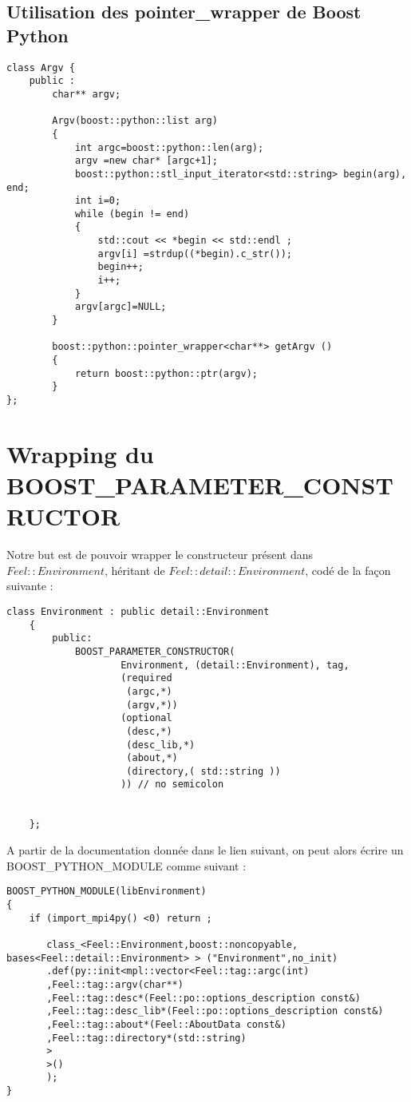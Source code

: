 \documentclass[12pt]{article}
\begin{document}
\subsection{Utilisation des pointer\_wrapper de Boost Python}

\begin{lstlisting}
class Argv {
    public :
        char** argv;

        Argv(boost::python::list arg)
        {
            int argc=boost::python::len(arg);
            argv =new char* [argc+1];
            boost::python::stl_input_iterator<std::string> begin(arg), end;
            int i=0;
            while (begin != end)
            {
                std::cout << *begin << std::endl ;
                argv[i] =strdup((*begin).c_str());
                begin++;
                i++;
            }
            argv[argc]=NULL;
        }

        boost::python::pointer_wrapper<char**> getArgv () 
        {
            return boost::python::ptr(argv);
        }
};
\end{lstlisting}


\section{Wrapping du BOOST\_PARAMETER\_CONSTRUCTOR}

Notre but est de pouvoir wrapper le constructeur présent dans $Feel::Environment$, héritant de $Feel::detail::Environment$, codé de la façon suivante :

\begin{lstlisting}
class Environment : public detail::Environment
    {
        public:
            BOOST_PARAMETER_CONSTRUCTOR(
                    Environment, (detail::Environment), tag,
                    (required
                     (argc,*)
                     (argv,*))
                    (optional
                     (desc,*)
                     (desc_lib,*)
                     (about,*)
                     (directory,( std::string ))
                    )) // no semicolon


    };
\end{lstlisting}

A partir de la documentation donnée dans le lien suivant, on peut alors écrire un BOOST\_PYTHON\_MODULE comme suivant :

\begin{lstlisting}
BOOST_PYTHON_MODULE(libEnvironment)
{
    if (import_mpi4py() <0) return ;
    
       class_<Feel::Environment,boost::noncopyable, bases<Feel::detail::Environment> > ("Environment",no_init)
       .def(py::init<mpl::vector<Feel::tag::argc(int)
       ,Feel::tag::argv(char**)
       ,Feel::tag::desc*(Feel::po::options_description const&)
       ,Feel::tag::desc_lib*(Feel::po::options_description const&)
       ,Feel::tag::about*(Feel::AboutData const&)
       ,Feel::tag::directory*(std::string)
       >
       >()
       );  
}
\end{lstlisting}
\end{document}
